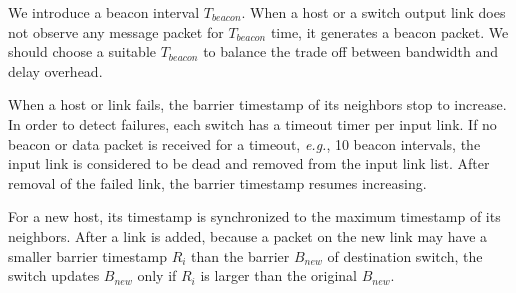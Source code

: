 We introduce a beacon interval $T_{beacon}$. When a host or a switch output link does not observe any message packet for $T_{beacon}$ time, it generates a beacon packet. We should choose a suitable $T_{beacon}$ to balance the trade off between bandwidth and delay overhead. %

When a host or link fails, the barrier timestamp of its neighbors stop to increase. 
In order to detect failures, each switch has a timeout timer per input link. If no beacon or data packet is received for a timeout, \textit{e.g.}, 10 beacon intervals, the input link is considered to be dead and removed from the input link list.
After removal of the failed link, the barrier timestamp resumes increasing.

For a new host, its timestamp is synchronized to the maximum timestamp of its neighbors. After a link is added, because a packet on the new link may have a smaller barrier timestamp $R_i$ than the barrier $B_{new}$ of destination switch, the switch updates $B_{new}$ only if $R_i$ is larger than the original $B_{new}$.







